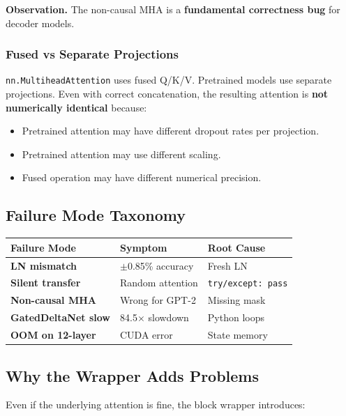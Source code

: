 \textbf{Observation.} The non-causal MHA is a \textbf{fundamental correctness bug} for 
decoder models.

\subsubsection{Fused vs Separate Projections}

\texttt{nn.MultiheadAttention} uses fused Q/K/V. Pretrained models use separate 
projections. Even with correct concatenation, the resulting attention is 
\textbf{not numerically identical} because:

\begin{itemize}
\item Pretrained attention may have different dropout rates per projection.
\item Pretrained attention may use different scaling.
\item Fused operation may have different numerical precision.

\end{itemize}
\subsection{Failure Mode Taxonomy}

\begin{table}[H]
\centering
\small
\begin{tabular}{lll}
\toprule
\textbf{Failure Mode} & \textbf{Symptom} & \textbf{Root Cause} \\
\midrule
\textbf{LN mismatch} & $\pm$0.85\% accuracy & Fresh LN \\
\textbf{Silent transfer} & Random attention & \texttt{try/except: pass} \\
\textbf{Non-causal MHA} & Wrong for GPT-2 & Missing mask \\
\textbf{GatedDeltaNet slow} & 84.5$\times$ slowdown & Python loops \\
\textbf{OOM on 12-layer} & CUDA error & State memory \\
\bottomrule
\end{tabular}
\end{table}

\subsection{Why the Wrapper Adds Problems}

Even if the underlying attention is fine, the block wrapper introduces:

